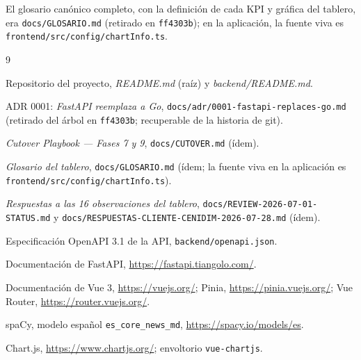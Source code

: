 \documentclass[11pt,letterpaper,twoside]{report}
\newcommand{\codigo}[1]{\texttt{#1}}
\begin{document}
El glosario canónico completo, con la definición de cada KPI y gráfica
del tablero, era \codigo{docs/GLOSARIO.md} (retirado en
\codigo{ff4303b}); en la aplicación, la fuente viva es
\codigo{frontend/src/\allowbreak config/\allowbreak chartInfo.ts}.

\begin{thebibliography}{9}

 Repositorio del proyecto,
  \textit{README.md} (raíz) y \textit{backend/README.md}.

 ADR 0001: \textit{FastAPI reemplaza a Go},
  \codigo{docs/adr/0001-fastapi-replaces-go.md} (retirado del árbol en
  \codigo{ff4303b}; recuperable de la historia de git).

 \textit{Cutover Playbook --- Fases 7 y 9},
  \codigo{docs/CUTOVER.md} (ídem).

 \textit{Glosario del tablero},
  \codigo{docs/GLOSARIO.md} (ídem; la fuente viva en la aplicación es
  \codigo{frontend/src/config/chartInfo.ts}).

 \textit{Respuestas a las 16 observaciones del tablero},
  \codigo{docs/REVIEW-2026-07-01-STATUS.md} y
  \codigo{docs/RESPUESTAS-CLIENTE-CENIDIM-2026-07-28.md} (ídem).

 Especificación OpenAPI 3.1 de la API,
  \codigo{backend/openapi.json}.

 Documentación de FastAPI,
  \url{https://fastapi.tiangolo.com/}.

 Documentación de Vue 3, \url{https://vuejs.org/};
  Pinia, \url{https://pinia.vuejs.org/};
  Vue Router, \url{https://router.vuejs.org/}.

 spaCy, modelo español \codigo{es_core_news_md},
  \url{https://spacy.io/models/es}.

 Chart.js, \url{https://www.chartjs.org/};
  envoltorio \codigo{vue-chartjs}.

\end{thebibliography}
\end{document}
